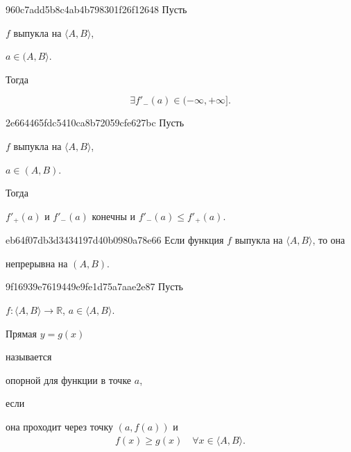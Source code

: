\begin{note}{960c7add5b8c4ab4b798301f26f12648}
    Пусть \begin{icloze}{3}\( f \) выпукла на \( \langle A, B \rangle  \),\end{icloze} \begin{icloze}{2}\( a \in (A, B \rangle  \).\end{icloze} Тогда
    \begin{icloze}{1}
        \[
            \exists f'_-(a) \in (-\infty, +\infty ].
        \]
    \end{icloze}
\end{note}

\begin{note}{2e664465fdc5410ca8b72059cfe627bc}
    Пусть \begin{icloze}{3}\( f \) выпукла на \( \langle A, B \rangle  \),\end{icloze} \begin{icloze}{2}\( a \in (A, B) \).\end{icloze} Тогда \begin{icloze}{1}\( f'_+ (a) \) и \( f'_- (a) \) конечны и \( f'_- (a) \leqslant f'_+ (a) \).\end{icloze}
\end{note}

\begin{note}{eb64f07db3d3434197d40b0980a78e66}
    Если функция \( f \) выпукла на \( \langle A, B \rangle  \), то она \begin{icloze}{1}непрерывна на \( (A, B) \).\end{icloze}
\end{note}

\begin{note}{9f16939e7619449e9fe1d75a7aae2e87}
    Пусть \begin{icloze}{3}\( f : \langle A, B \rangle \to \mathbb R  \), \( a \in \langle A, B \rangle  \).\end{icloze}
    \begin{icloze}{2}Прямая \( y = g(x) \)\end{icloze} называется \begin{icloze}{1}опорной для функции в точке \( a \),\end{icloze} если
    \begin{icloze}{2}
        она проходит через точку \( (a, f(a)) \) и
        \[
            \begin{gathered}
                f(x) \geqslant g(x) \quad \forall x \in \langle A, B \rangle.
            \end{gathered}
        \]
    \end{icloze}
\end{note}

